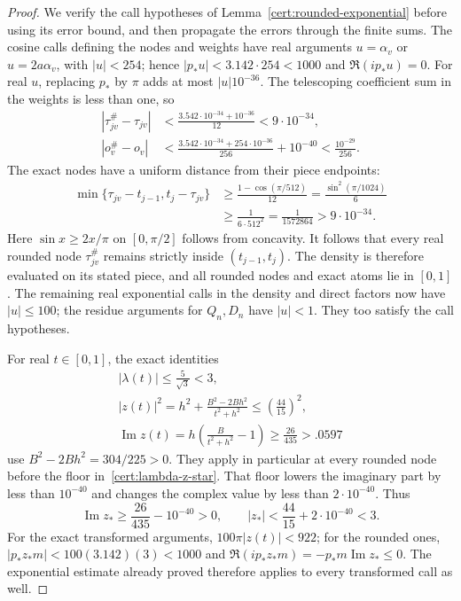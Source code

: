 \begin{proof}
We verify the call hypotheses of Lemma~\ref{cert:rounded-exponential}
before using its error bound, and then propagate the errors through the
finite sums.  The cosine calls defining the nodes and weights have real arguments
$u=\alpha_v$ or $u=2a\alpha_v$, with $|u|<254$; hence
$|p_*u|<3.142\cdot254<1000$ and $\Re(ip_*u)=0$.
For real $u$, replacing $p_*$ by $\pi$ adds at most $|u|10^{-36}$.
The telescoping coefficient sum in the weights is less than one, so
\[
\begin{aligned}
 |\tau_{jv}^{\#}-\tau_{jv}|
  &<\frac{3.542\cdot10^{-34}+10^{-36}}{12}<9\cdot10^{-34},\\
 |o_v^{\#}-o_v|
  &<\frac{3.542\cdot10^{-34}+254\cdot10^{-36}}{256}
       +10^{-40}<\frac{10^{-29}}{256}.
\end{aligned}
\]
The exact nodes have a uniform distance from their piece endpoints:
\[
\begin{aligned}
 \min\{\tau_{jv}-t_{j-1},t_j-\tau_{jv}\}
 &\ge\frac{1-\cos(\pi/512)}{12}
  =\frac{\sin^2(\pi/1024)}6\\
 &\ge\frac1{6\cdot512^2}=\frac1{1572864}>9\cdot10^{-34}.
\end{aligned}
\]
Here $\sin x\ge2x/\pi$ on $[0,\pi/2]$ follows from concavity.
It follows that every real rounded node $\tau_{jv}^{\#}$ remains strictly
inside $(t_{j-1},t_j)$.  The density is therefore evaluated on its stated
piece, and all rounded nodes and exact atoms lie in $[0,1]$.
The remaining real exponential calls in the density and direct factors
now have $|u|\le100$; the residue arguments for $Q_n,D_n$ have $|u|<1$.
They too satisfy the call hypotheses.

For real $t\in[0,1]$, the exact identities
\[
\begin{gathered}
 |\lambda(t)|\le\frac5{\sqrt3}<3,\\
 |z(t)|^2=h^2+\frac{B^2-2Bh^2}{t^2+h^2}\le\left(\frac{44}{15}\right)^2,\\
 \operatorname{Im}z(t)=h\left(\frac B{t^2+h^2}-1\right)
       \ge\frac{26}{435}>.0597
\end{gathered}
\]
use $B^2-2Bh^2=304/225>0$.  They apply in particular at every rounded
node before the floor in~\eqref{cert:lambda-z-star}.  That floor lowers the
imaginary part by less than $10^{-40}$ and changes the complex value by
less than $2\cdot10^{-40}$.  Thus
\[
 \operatorname{Im}z_*\ge\frac{26}{435}-10^{-40}>0,
 \qquad |z_*|<\frac{44}{15}+2\cdot10^{-40}<3.
\]
For the exact transformed arguments, $100\pi|z(t)|<922$; for the rounded
ones, $|p_*z_*m|<100(3.142)(3)<1000$ and
$\Re(ip_*z_*m)=-p_*m\operatorname{Im}z_*\le0$.
The exponential estimate already proved therefore applies to every
transformed call as well.


\end{proof}
